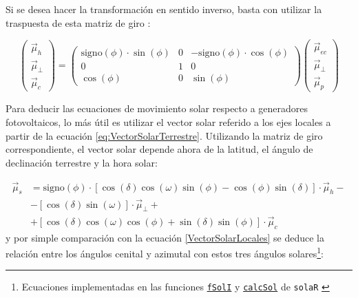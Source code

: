 Si se desea hacer la transformación en sentido inverso, basta con
utilizar la traspuesta de esta matriz de giro :

\begin{equation}
\left(\begin{array}{c}
\vec{\mu}_{h}\\
\vec{\mu}_{\bot}\\
\vec{\mu}_{c}\end{array}\right)=\left(\begin{array}{ccc}
\mathrm{signo}(\phi)\cdot\sin(\phi) & 0 & -\mathrm{signo}(\phi)\cdot\cos(\phi)\\
0 & 1 & 0\\
\cos(\phi) & 0 & \sin(\phi)\end{array}\right)\left(\begin{array}{c}
\vec{\mu}_{ec}\\
\vec{\mu}_{\bot}\\
\vec{\mu}_{p}\end{array}\right)\end{equation}


Para deducir las ecuaciones de movimiento solar respecto a generadores
fotovoltaicos, lo más útil es utilizar el vector solar referido a
los ejes locales a partir de la ecuación \eqref{eq:VectorSolarTerrestre}.
Utilizando la matriz de giro correspondiente, el vector solar depende
ahora de la latitud, el ángulo de declinación terrestre y la hora
solar:

\begin{align}
\vec{\mu}_{s} & =\mathrm{signo}(\phi)\cdot\left[\cos\left(\delta\right)\cos\left(\omega\right)\sin\left(\phi\right)-\cos\left(\phi\right)\sin\left(\delta\right)\right]\cdot\vec{\mu}_{h}-\nonumber \\
 & -\left[\cos\left(\delta\right)\sin\left(\omega\right)\right]\cdot\vec{\mu}_{\bot}+\label{eq:VectorSolarLocales2}\\
 & +\left[\cos\left(\delta\right)\cos\left(\omega\right)\cos\left(\phi\right)+\sin\left(\delta\right)\sin\left(\phi\right)\right]\cdot\vec{\mu}_{c}\nonumber \end{align}
y por simple comparación con la ecuación \eqref{VectorSolarLocales}
se deduce la relación entre los ángulos cenital y azimutal con estos
tres ángulos solares\footnote{Ecuaciones implementadas en las
  funciones
  \href{http://search.r-project.org/R/library/solaR/html/fSolI.html}{\texttt{fSolI}}
  y
  \href{http://search.r-project.org/R/library/solaR/html/calcSol.html}{\texttt{calcSol}}
  de \texttt{solaR} \cite{Perpinan2012b}}: 

